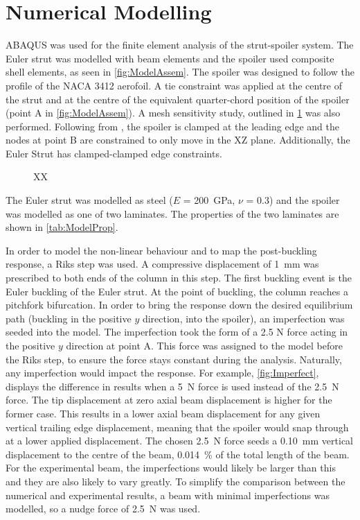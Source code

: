 \documentclass{IEEEtran}
\begin{document}
    \section{Numerical Modelling}
    ABAQUS was used for the finite element analysis of the strut-spoiler system. The Euler strut was modelled with beam elements and the spoiler used composite shell elements, as seen in \cref{fig:ModelAssem}. The spoiler was designed to follow the profile of the NACA 3412 aerofoil. 
    A tie constraint was applied at the centre of the strut and at the centre of the equivalent quarter-chord position of the spoiler (point A in \cref{fig:ModelAssem}). A mesh sensitivity study, outlined in \cref{fig:MeshSens} was also performed. Following from \cite{Wheatcroft_2023}, the spoiler is clamped at the leading edge and the nodes at point B are constrained to only move in the XZ plane. Additionally, the Euler Strut has clamped-clamped edge constraints. 

        \begin{figure}[!h]
        \footnotesize
        \centering
        
        \caption{ XX }
        \label{fig:MeshSens}
    \end{figure}
    \normalfont
    The Euler strut was modelled as steel ($E$ = \SI{200}{GPa}, $\nu$ = \SI{0.3}{}) and the spoiler was modelled as one of two laminates.  The properties of the two laminates are shown in \cref{tab:ModelProp}.
    
    In order to model the non-linear behaviour and to map the post-buckling response, a Riks step was used. A compressive displacement of \SI{1}{\milli\meter} was prescribed to both ends of the column in this step. The first buckling event is the Euler buckling of the Euler strut. At the point of buckling, the column reaches a pitchfork bifurcation. In order to bring the response down the desired equilibrium path (buckling in the positive $y$ direction, into the spoiler), an imperfection was seeded into the model. The imperfection took the form of a 2.5 N force acting in the positive $y$ direction at point A. This force was assigned to the model before the Riks step, to ensure the force stays constant during the analysis. Naturally, any imperfection would impact the response. For example, \cref{fig:Imperfect}, displays the difference in results when a \SI{5}{\newton} force is used instead of the \SI{2.5}{\newton} force. The tip displacement at zero axial beam displacement is higher for the former case. This results in a lower axial beam displacement for any given vertical trailing edge displacement, meaning that the spoiler would snap through at a lower applied displacement. The chosen \SI{2.5}{\newton} force seeds a \SI{0.10}{\milli\meter} vertical displacement to the centre of the beam, \SI{0.014}{\percent} of the total length of the beam. For the experimental beam, the imperfections would likely be larger than this and they are also likely to vary greatly. To simplify the comparison between the numerical and experimental results, a beam with minimal imperfections was modelled, so a nudge force of \SI{2.5}{\newton} was used. 
\end{document}
